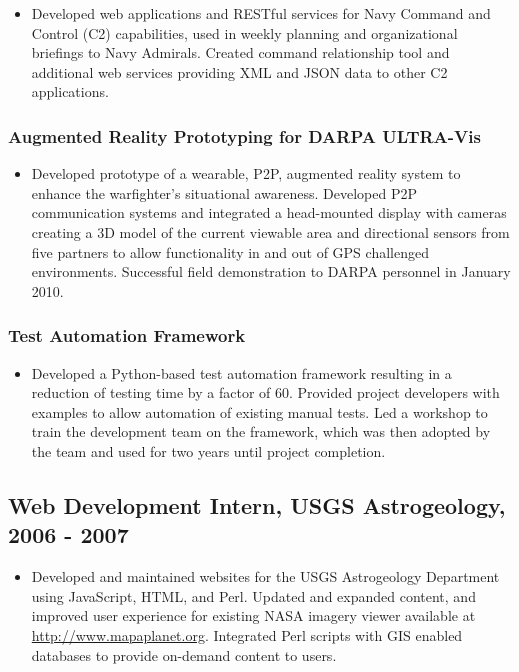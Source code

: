 \documentclass[11pt]{article}
\begin{document}
\begin{itemize}
\item Developed web applications and RESTful services for Navy Command and Control (C2) capabilities, used in weekly planning and organizational briefings to Navy Admirals. Created command relationship tool and additional web services providing XML and JSON data to other C2 applications.
\end{itemize}
\subsubsection*{Augmented Reality Prototyping for DARPA ULTRA-Vis}
\label{sec-1.1.4}

\begin{itemize}
\item Developed prototype of a wearable, P2P, augmented reality system to enhance the warfighter's situational awareness. Developed P2P communication systems and integrated a head-mounted display with cameras creating a 3D model of the current viewable area and directional sensors from five partners to allow functionality in and out of GPS challenged environments. Successful field demonstration to DARPA personnel in January 2010.
\end{itemize}
\subsubsection*{Test Automation Framework}
\label{sec-1.1.5}

\begin{itemize}
\item Developed a Python-based test automation framework resulting in a reduction of testing time by a factor of 60. Provided project developers with examples to allow automation of existing manual tests. Led a workshop to train the development team on the framework, which was then adopted by the team and used for two years until project completion.
\end{itemize}
\subsection*{Web Development Intern, USGS Astrogeology, 2006 - 2007}
\label{sec-1.2}

\begin{itemize}
\item Developed and maintained websites for the USGS Astrogeology Department using JavaScript, HTML, and Perl. Updated and expanded content, and improved user experience for existing NASA imagery viewer available at \href{http://www.mapaplanet.org}{http://www.mapaplanet.org}. Integrated Perl scripts with GIS enabled databases to provide on-demand content to users.
\end{itemize}
\end{document}
